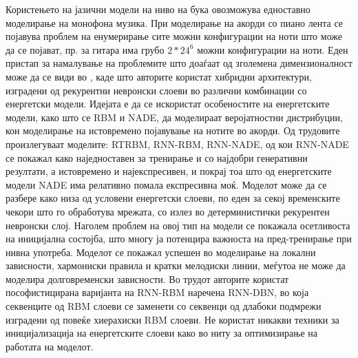 Користењето на јазични модели на ниво на бука овозможува едноставно моделирање на монофона музика. При моделирање на акорди со пиано лента се појавува проблем на енумерирање сите можни конфигурации на ноти што може да се појават, пр. за гитара има грубо $2*24^6$ можни конфигурации на ноти. Еден пристап за намалување на проблемите што доаѓаат од зголемена димензионалност може да се види во \cite{Boulanger-Lewandowski2012, Boulanger-Lewandowski2014, Goel2014}, каде што авторите користат хибридни архитектури, изградени од рекурентни невронски слоеви во различни комбинации со енергетски модели. Идејата е да се искористат особеностите на енергетските модели, како што се RBM и NADE, да моделираат веројатностни дистрибуции, кон моделирање на истовремено појавување на нотите во акорди. Од трудовите \cite{Boulanger-Lewandowski2012, Boulanger-Lewandowski2014} произлегуваат моделите: RTRBM, RNN-RBM, RNN-NADE, од кои RNN-NADE се покажал како наједноставен за тренирање и со најдобри генеративни резултати, а истовремено и најекспресивен, и покрај тоа што од енергетските модели NADE има релативно помала експресивна моќ. Моделот може да се разбере како низа од условени енергетски слоеви, по еден за секој временските чекори што го обработува мрежата, со излез во детерминистички рекурентен невронски слој. Наголем проблем на овој тип на модели се покажала осетливоста на иницијална состојба, што многу ја потенцира важноста на пред-тренирање при нивна употреба. Моделот се покажал успешен во моделирање на локални зависности, хармониски правила и кратки мелодиски линии, меѓутоа не може да моделира долговременски зависности. Во трудот \cite{Goel2014} авторите користат пософистицирана варијанта на RNN-RBM наречена RNN-DBN, во која секвенците од RBM слоеви се заменети со секвенци од длабоки подмрежи изградени од повеќе хиерахиски RBM слоеви. Не користат никакви техники за иницијализација на енергетските слоеви како во \cite{Boulanger-Lewandowski2012, Boulanger-Lewandowski2014, Goel2014} ниту за оптимизирање на работата на моделот.

